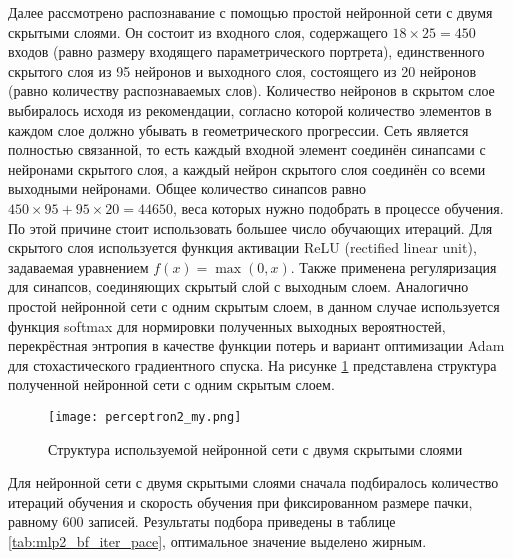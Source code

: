 Далее рассмотрено распознавание с помощью простой нейронной сети с двумя скрытыми слоями.
Он состоит из входного слоя, содержащего $18 \times 25 = 450$ входов (равно размеру входящего параметрического портрета), единственного скрытого слоя из 95 нейронов и выходного слоя, состоящего из 20 нейронов (равно количеству распознаваемых слов).
Количество нейронов в скрытом слое выбиралось исходя из рекомендации, согласно которой количество элементов в каждом слое должно убывать в геометрического прогрессии.
Сеть является полностью связанной, то есть каждый входной элемент соединён синапсами с нейронами скрытого слоя, а каждый нейрон скрытого слоя соединён со всеми выходными нейронами.
Общее количество синапсов равно $450 \times 95 + 95 \times 20 = 44650$, веса которых нужно подобрать в процессе обучения.
По этой причине стоит использовать большее число обучающих итераций.
Для скрытого слоя используется функция активации ReLU (rectified linear unit), задаваемая уравнением $f(x) = \max (0, x)$.
Также применена регуляризация для синапсов, соединяющих скрытый слой с выходным слоем.
Аналогично простой нейронной сети с одним скрытым слоем, в данном случае используется функция softmax для нормировки полученных выходных вероятностей, перекрёстная энтропия в качестве функции потерь и вариант оптимизации Adam для стохастического градиентного спуска.
На рисунке \ref{fig:perceptron2_my} представлена структура полученной нейронной сети с одним скрытым слоем.

\begin{figure}[h]
	\centering
	\texttt{[image: perceptron2\_my.png]}
	\caption{Структура используемой нейронной сети с двумя скрытыми слоями}
	\label{fig:perceptron2_my}
\end{figure}

Для нейронной сети с двумя скрытыми слоями сначала подбиралось количество итераций обучения и скорость обучения при фиксированном размере пачки, равному 600 записей.
Результаты подбора приведены в таблице \ref{tab:mlp2_bf_iter_pace}, оптимальное значение выделено жирным.

